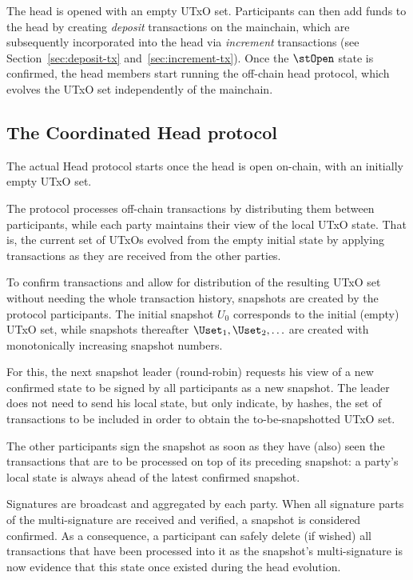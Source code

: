 

The head is opened with an empty UTxO set. Participants can then add funds to the
head by creating \emph{deposit} transactions on the mainchain, which are
subsequently incorporated into the head via \emph{increment} transactions (see
Section~\ref{sec:deposit-tx} and~\ref{sec:increment-tx}). Once the $\stOpen$
state is confirmed, the head members start running the off-chain head protocol,
which evolves the UTxO set independently of the mainchain.


\subsection{The Coordinated Head protocol}

The actual Head protocol starts once the head is open on-chain, with an initially
empty UTxO set.

The protocol processes off-chain transactions by distributing them between participants,
while each party maintains their view of the local UTxO state. That is, the current
set of UTxOs evolved from the empty initial state by applying transactions as they
are received from the other parties.

To confirm transactions and allow for distribution of the resulting UTxO set
without needing the whole transaction history, snapshots are created by the
protocol participants. The initial snapshot $U_{0}$ corresponds to the initial
(empty) UTxO set, while snapshots thereafter $\Uset_1,\Uset_2,\ldots$ are created with
monotonically increasing snapshot numbers.

For this, the next snapshot leader (round-robin) requests his view of a new confirmed state to be
signed by all participants as a new snapshot. The leader does not need to send his local state,
but only indicate, by hashes, the set of transactions to be included in order to
obtain the to-be-snapshotted UTxO set.

The other participants sign the snapshot as soon as they have (also) seen the
transactions that are to be processed on top of its preceding snapshot: a
party's local state is always ahead of the latest confirmed snapshot.

Signatures are broadcast and aggregated by each party. When all signature parts
of the multi-signature are received and verified, a snapshot is considered
confirmed. As a consequence, a participant can safely delete (if wished) all
transactions that have been processed into it as the snapshot's multi-signature
is now evidence that this state once existed during the head evolution.

